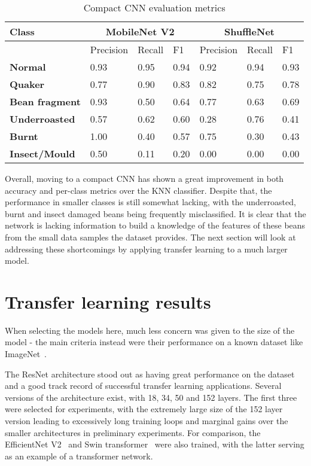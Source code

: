 \begin{table}
    \centering
    \begin{tabular}{*7l}
        \toprule
        \textbf{Class} & \multicolumn{3}{c}{MobileNet V2} & \multicolumn{3}{c}{ShuffleNet} \\
        \midrule
        {} & Precision & Recall & F1 & Precision & Recall & F1 \\
        \textbf{Normal} & 0.93 & 0.95 & 0.94 & 0.92 & 0.94 & 0.93  \\
        \textbf{Quaker} & 0.77 & 0.90 & 0.83 & 0.82 & 0.75 & 0.78 \\
        \textbf{Bean fragment} & 0.93 & 0.50 & 0.64 & 0.77 & 0.63 & 0.69 \\
        \textbf{Underroasted} & 0.57 & 0.62 & 0.60 & 0.28 & 0.76 & 0.41 \\
        \textbf{Burnt} & 1.00 & 0.40 & 0.57 & 0.75 & 0.30 & 0.43 \\
        \textbf{Insect/Mould} & 0.50 & 0.11 & 0.20 & 0.00 & 0.00 & 0.00  \\
        \bottomrule
    \end{tabular}
    \caption{Compact CNN evaluation metrics}
    \label{tab:cnn-small-scores}
\end{table}

Overall, moving to a compact CNN has shown a great improvement in both accuracy and per-class metrics over the KNN
classifier.
Despite that, the performance in smaller classes is still somewhat lacking, with the underroasted, burnt and insect damaged
beans being frequently misclassified.
It is clear that the network is lacking information to build a knowledge of the features of these beans from the small
data samples the dataset provides.
The next section will look at addressing these shortcomings by applying transfer learning to a much larger model.
\section{Transfer learning results}
\label{sec:transfer-learning-results}
When selecting the models here, much less concern was given to the size of the model - the main criteria instead were
their performance on a known dataset like ImageNet~\cite{imageNet}.

The ResNet architecture stood out as having great performance on the dataset and a good track record of successful
transfer learning applications.
Several versions of the architecture exist, with 18, 34, 50 and 152 layers.
The first three were selected for experiments, with the extremely large size of the 152 layer version leading to excessively long
training loops and marginal gains over the smaller architectures in preliminary experiments.
For comparison, the EfficientNet V2~\cite{efficientNet} and Swin transformer~\cite{swinTransformer} were also trained,
with the latter serving as an example of a transformer network.

